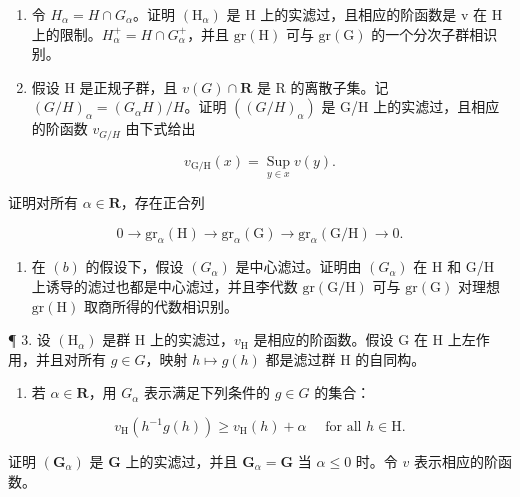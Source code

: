 \begin{enumerate}
\def\labelenumi{(\alph{enumi})}
\item
  令 \(H_{\alpha} = H \cap G_{\alpha}\)。证明 \((\mathrm{H}_{\alpha})\) 是 H 上的实滤过，且相应的阶函数是 v 在 H 上的限制。\(H_{\alpha}^{+} = H \cap G_{\alpha}^{+}\)，并且 \(\mathrm{gr}(\mathrm{H})\) 可与 \(\mathrm{gr}(\mathrm{G})\) 的一个分次子群相识别。
\item
  假设 H 是正规子群，且 \(v(G) \cap \mathbf{R}\) 是 R 的离散子集。记 \((G/H)_{\alpha} = (G_{\alpha}H)/H\)。证明 \(((G/H)_{\alpha})\) 是 G/H 上的实滤过，且相应的阶函数 \(v_{G/H}\) 由下式给出
\end{enumerate}

\[
v _ {\mathrm{G/H}} (x) = \operatorname * {S u p} _ {y \in x} v (y).
\]

证明对所有 \(\alpha \in \mathbf{R}\)，存在正合列

\[
0 \rightarrow \mathrm{gr} _ {\alpha} (\mathrm{H}) \rightarrow \mathrm{gr} _ {\alpha} (\mathrm{G}) \rightarrow \mathrm{gr} _ {\alpha} (\mathrm{G} / \mathrm{H}) \rightarrow 0.
\]

\begin{enumerate}
\def\labelenumi{(\alph{enumi})}
\setcounter{enumi}{2}
\tightlist
\item
  在 \((b)\) 的假设下，假设 \((G_{\alpha})\) 是中心滤过。证明由 \((G_{\alpha})\) 在 H 和 G/H 上诱导的滤过也都是中心滤过，并且李代数 \(\mathrm{gr}(\mathrm{G}/\mathrm{H})\) 可与 \(\mathrm{gr}(\mathrm{G})\) 对理想 \(\mathrm{gr}(\mathrm{H})\) 取商所得的代数相识别。
\end{enumerate}

¶ 3. 设 \((\mathrm{H}_{\alpha})\) 是群 H 上的实滤过，\(v_{\mathrm{H}}\) 是相应的阶函数。假设 G 在 H 上左作用，并且对所有 \(g \in G\)，映射 \(h \mapsto g(h)\) 都是滤过群 H 的自同构。

\begin{enumerate}
\def\labelenumi{(\alph{enumi})}
\tightlist
\item
  若 \(\alpha \in \mathbf{R}\)，用 \(G_{\alpha}\) 表示满足下列条件的 \(g \in G\) 的集合：
\end{enumerate}

\[
v _ {\mathrm{H}} (h ^ {- 1} g (h)) \geqslant v _ {\mathrm{H}} (h) + \alpha \quad \text { for   all } h \in \mathrm{H}.
\]

证明 \((\mathbf{G}_{\alpha})\) 是 \(\mathbf{G}\) 上的实滤过，并且 \(\mathbf{G}_{\alpha} = \mathbf{G}\) 当 \(\alpha \leqslant 0\) 时。令 \(v\) 表示相应的阶函数。

